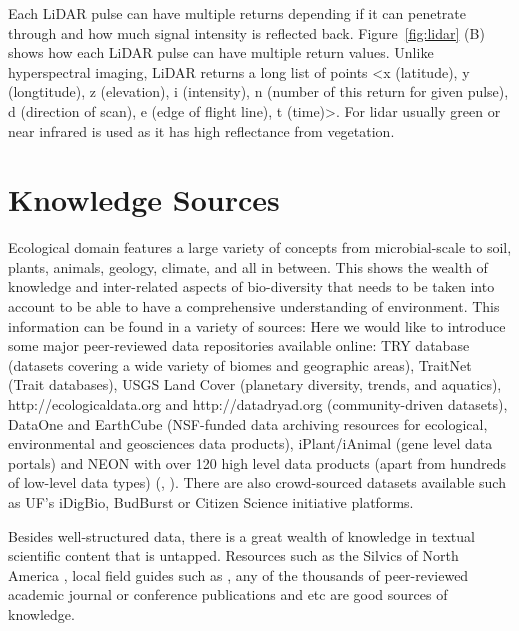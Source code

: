 Each LiDAR pulse can have multiple returns depending if it can penetrate through and how much signal intensity is reflected back. Figure~\ref{fig:lidar} (B) shows how each LiDAR pulse can have multiple return values. Unlike hyperspectral imaging, LiDAR returns a long list of points \textless x (latitude), y (longtitude), z (elevation), i (intensity), n (number of this return for given pulse), d (direction of scan), e (edge of flight line), t (time)\textgreater. For lidar usually green or near infrared is used as it has high reflectance from vegetation.




\section{Knowledge Sources}

Ecological domain features a large variety of concepts from microbial-scale to soil, plants, animals, geology, climate, and all in between. This shows the wealth of knowledge and inter-related aspects of bio-diversity that needs to be taken into account to be able to have a comprehensive understanding of environment. This information can be found in a variety of sources: Here we would like to introduce some major peer-reviewed data repositories available online: TRY database (datasets covering a wide variety of biomes and geographic areas), TraitNet (Trait databases), USGS Land Cover (planetary diversity, trends, and aquatics), http://ecologicaldata.org and http://datadryad.org (community-driven datasets), DataOne and EarthCube (NSF-funded data archiving resources for ecological, environmental and geosciences data products), iPlant/iAnimal (gene level data portals) and NEON with over 120 high level data products (apart from hundreds of low-level data types) (\citep{keller2010neon}, \citep{lunch2014neonLevel}). There are also crowd-sourced datasets available such as UF’s iDigBio, BudBurst or Citizen Science initiative platforms.

Besides well-structured data, there is a great wealth of knowledge in textual scientific content that is untapped. Resources such as the Silvics of North America \citep{burns1990silvics}, local field guides such as \citep{inventory1990guide, lillybridge1995field}, any of the thousands of peer-reviewed academic journal or conference publications and etc are good sources of knowledge.

